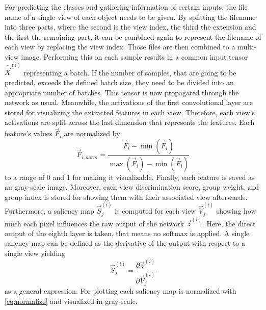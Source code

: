 For predicting the classes and gathering information of certain inputs, the file name of a single view of each object needs to be given.
By splitting the filename into three parts, where the second is the view index, the third the extension and the first the remaining part, it can be combined again to represent the filename of each view by replacing the view index.
Those files are then combined to a multi-view image.
Performing this on each sample results in a common input tensor $\bar{\vec{X}}^{(i)}$ representing a batch.
If the number of samples, that are going to be predicted, exceeds the defined batch size, they need to be divided into an appropriate number of batches.
This tensor is now propagated through the network as usual.
Meanwhile, the activations of the first convolutional layer are stored for visualizing the extracted features in each view.
Therefore, each view's activations are split across the last dimension that represents the features.
Each feature's values $\vec{F}_i$ are normalized by
\begin{equation}
	\label{eq:normalize}
	\vec{F}_{i,norm} = \frac{\vec{F}_i - \min(\vec{F}_i)}{\max(\vec{F}_i) - \min(\vec{F}_i)} 
\end{equation}
to a range of 0 and 1 for making it visualizable.
Finally, each feature is saved as an gray-scale image.
Moreover, each view discrimination score, group weight, and group index is stored for showing them with their associated view afterwards.
Furthermore, a saliency map $\vec{S}_j^{(i)}$ is computed for each view $\vec{V}_j^{(i)}$ showing how much each pixel influences the raw output of the network $\vec{z}^{(i)}$.
Here, the direct output of the eighth layer is taken, that means no softmax is applied.
A single saliency map can be defined as the derivative of the output with respect to a single view yielding
\begin{equation}
	\label{eq:saliency-map}
	\vec{S}_j^{(i)} = \frac{\partial \vec{z}^{(i)}}{\partial \vec{V}_j^{(i)}}
\end{equation}
as a general expression.
For plotting each saliency map is normalized with \eqref{eq:normalize} and visualized in gray-scale.